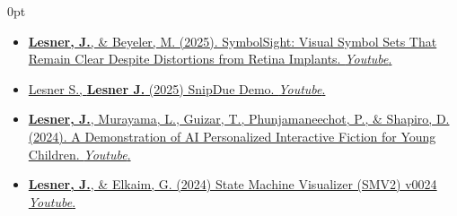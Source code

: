 \documentclass[11pt]{article}
\newlength{\sectionwidth}
\newcommand{\CVSection}[2]{%
  \vspace{1.4em} 
  \noindent
  \makebox[0pt][l]{%
    \parbox[t]{\sectionwidth}{%
      \raggedright\scshape\bfseries\small #1%
    }%
  }%
  \begin{adjustwidth}{\sectionwidth}{0pt}
    #2
  \end{adjustwidth}
}
\begin{document}
    





\CVSection{Demos}{%
  \begin{itemize}
      
    \item \href{https://youtu.be/S6PFpY1Rfho}{\textbf{Lesner, J.}, \& Beyeler, M. (2025). SymbolSight: Visual Symbol Sets That Remain Clear Despite Distortions from Retina Implants. \textit{Youtube}.}
    
    \item \href{https://youtu.be/SXRZ5oiWmYE}{Lesner S., \textbf{Lesner J.} (2025) SnipDue Demo. \textit{Youtube}.}
    
    \item \href{https://youtu.be/TaVGem3nFrk}{\textbf{Lesner, J.}, Murayama, L., Guizar, T., Phunjamaneechot, P., \& Shapiro, D. (2024). A Demonstration of AI Personalized Interactive Fiction for Young Children. \textit{Youtube}.}
    
    \item \href{https://youtu.be/IHp0X0J5Di8}{\textbf{Lesner, J.}, \& Elkaim, G. (2024) State Machine Visualizer (SMV2) v0024  \textit{Youtube}.}
  \end{itemize}
}
\end{document}
